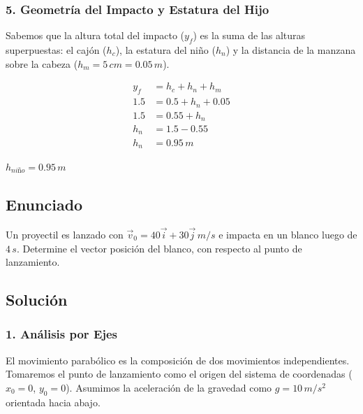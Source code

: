 \documentclass[12pt, a4paper]{article}
\begin{document}
\subsubsection*{5. Geometría del Impacto y Estatura del Hijo}
Sabemos que la altura total del impacto ($y_f$) es la suma de las alturas superpuestas: el cajón ($h_c$), la estatura del niño ($h_n$) y la distancia de la manzana sobre la cabeza ($h_m = 5 \, \si{cm} = 0.05 \, \si{m}$).

\begin{align*}
y_f &= h_c + h_n + h_m \\
1.5 &= 0.5 + h_n + 0.05 \\
1.5 &= 0.55 + h_n \\
h_n &= 1.5 - 0.55 \\
h_n &= 0.95 \, \si{m}
\end{align*}

\begin{tcolorbox}[colback=green!5!white, colframe=green!50!black, title=Respuesta Final]
\centering \Large $h_{niño} = 0.95 \, \si{m}$
\end{tcolorbox}

\newpage

\subsection*{Enunciado}
Un proyectil es lanzado con $\vec{v}_0 = 40\vec{i} + 30\vec{j} \, \si{m/s}$ e impacta en un blanco luego de $4 \, \si{s}$. Determine el vector posición del blanco, con respecto al punto de lanzamiento. 

\begin{center}
\end{center}

\subsection*{Solución}

\subsubsection*{1. Análisis por Ejes}
El movimiento parabólico es la composición de dos movimientos independientes. Tomaremos el punto de lanzamiento como el origen del sistema de coordenadas ($x_0 = 0$, $y_0 = 0$). Asumimos la aceleración de la gravedad como $g = 10 \, \si{m/s^2}$ orientada hacia abajo.
\end{document}
